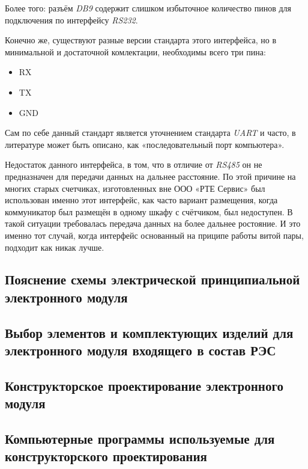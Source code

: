 Более того: разъём \textit{DB9}
содержит слишком избыточное количество
пинов для подключения по интерфейсу \textit{RS232}.

Конечно же, существуют разные версии стандарта этого интерфейса,
но в минимальной и достаточной комлектации,
необходимы всего три пина:
\begin{itemize}
\item RX
\item TX
\item GND
\end{itemize}

Сам по себе данный стандарт является уточнением
стандарта \textit{UART} и часто,
в литературе может быть описано, как
«последовательный порт компьютера».

Недостаток данного интерфейса, в том,
что в отличие от \textit{RS485}
он не предназначен для передачи данных на дальнее расстояние.
По этой причине на многих старых счетчиках,
изготовленных вне ООО «РТЕ Сервис» был
использован именно этот интерфейс,
как часто вариант размещения,
когда коммуникатор был размещён в одному шкафу с счётчиком,
был недоступен.
В такой ситуации требовалась передача данных на более дальнее ростояние.
И это именно тот случай, когда интерфейс
основанный на приципе работы витой пары,
подходит как никак лучше.


\subsection{Пояснение схемы электрической принципиальной электронного модуля}

\subsection{Выбор элементов и комплектующих изделий для электронного модуля входящего в состав РЭС}

\subsection{Конструкторское проектирование электронного модуля}

\subsection{Компьютерные программы используемые для конструкторского проектирования}

\newpage
